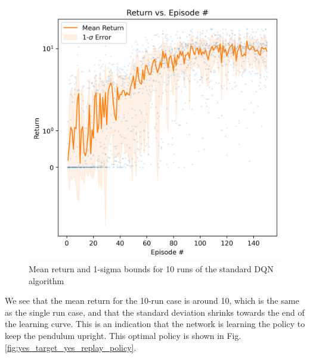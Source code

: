 \documentclass[conference]{IEEEtran}
\begin{document}
\begin{figure}[h]
\centering
\includegraphics[width=\linewidth]{../figures/yes_target_yes_replay/mean_return_150_1000_log_True.png}
\caption{Mean return and 1-sigma bounds for 10 runs of the standard DQN algorithm}
\label{fig:yes_target_yes_replay_10_runs}
\end{figure}
We see that the mean return for the 10-run case is around 10, which is the same as the single run case, and that the standard deviation shrinks towards the end of the learning curve. This is an indication that the network is learning the policy to keep the pendulum upright. This optimal policy is shown in Fig. \ref{fig:yes_target_yes_replay_policy}.
\end{document}

